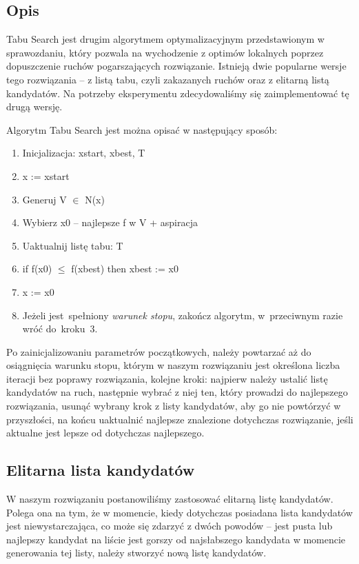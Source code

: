 \subsection{Opis}

Tabu Search jest drugim algorytmem optymalizacyjnym przedstawionym w sprawozdaniu, który pozwala na wychodzenie z optimów lokalnych poprzez dopuszczenie ruchów pogarszających rozwiązanie. Istnieją dwie popularne wersje tego rozwiązania -- z listą tabu, czyli zakazanych ruchów oraz z elitarną listą kandydatów. Na potrzeby eksperymentu zdecydowaliśmy się zaimplementować tę drugą wersję.

Algorytm Tabu Search jest można opisać w następujący sposób\cite{TS}:

\begin{enumerate}
    \item Inicjalizacja: xstart, xbest, T
    \item x := xstart
    \item Generuj V $\in$ N(x)
    \item Wybierz x0 -- najlepsze f w V + aspiracja
    \item Uaktualnij listę tabu: T
    \item if f(x0) $\le$ f(xbest) then xbest := x0
    \item x := x0
    \item Jeżeli jest~spełniony \emph{warunek stopu}, zakończ algorytm, w~przeciwnym razie wróć do~kroku~3.
\end{enumerate}

Po zainicjalizowaniu parametrów początkowych, należy powtarzać aż do osiągnięcia warunku stopu, którym w naszym rozwiązaniu jest określona liczba iteracji bez poprawy rozwiązania, kolejne kroki: najpierw należy ustalić listę kandydatów na ruch, następnie wybrać z niej ten, który prowadzi do najlepszego rozwiązania, usunąć wybrany krok z listy kandydatów, aby go nie powtórzyć w przyszłości, na końcu uaktualnić najlepsze znalezione dotychczas rozwiązanie, jeśli aktualne jest lepsze od dotychczas najlepszego.

\subsection{Elitarna lista kandydatów}

W naszym rozwiązaniu postanowiliśmy zastosować elitarną listę kandydatów. Polega ona na tym, że w momencie, kiedy dotychczas posiadana lista kandydatów jest niewystarczająca, co może się zdarzyć z dwóch powodów -- jest pusta lub najlepszy kandydat na liście jest gorszy od najsłabszego kandydata w momencie generowania tej listy, należy stworzyć nową listę kandydatów.

